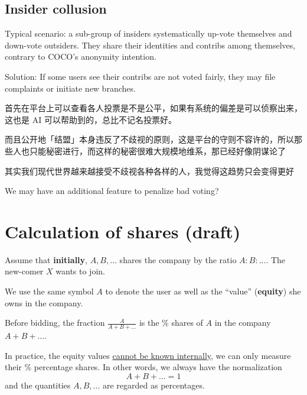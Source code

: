 \documentclass[12pt, orivec, fleqn]{article}
\newcommand{\cc}[2]{#1}
\newcommand{\cc}[2]{#2}
\begin{document}
\secttoc
\subsection{Insider collusion}

Typical scenario:  a sub-group of insiders systematically up-vote themselves and down-vote outsiders.  They share their identities and contribs among themselves, contrary to COCO's anonymity intention.

Solution:  If some users see their contribs are not voted fairly, they may file complaints or initiate new branches.

\cc{
首先在平台上可以查看各人投票是不是公平，如果有系统的偏差是可以侦察出来，这也是 AI 可以帮助到的，总比不记名投票好。}{
On our platform, we can examine every vote to see if they are fair.  If there is systematic bias it can be detected by people or AI algorithms.  This is definitely an improvement over secret ballot.
}

\cc{
而且公开地「结盟」本身违反了不歧视的原则，这是平台的守则不容许的，所以那些人也只能秘密进行，而这样的秘密很难大规模地维系，那已经好像阴谋论了}{
It is clearly against Coco's policy to form off-platform ``alliances'' to try to influence voting.  Such collusions can only be conducted in secret and would be hard to maintain for large numbers of people.  
}

\cc{
其实我们现代世界越来越接受不歧视各种各样的人，我觉得这趋势只会变得更好}{
	
}

We may have an additional feature to penalize bad voting?

\secttoc
\section{Calculation of shares (draft)}

Assume that \textbf{initially}, $A, B, ...$ shares the company by the ratio $A : B : ...$.  The new-comer $X$ wants to join.

We use the same symbol $A$ to denote the user as well as the ``value'' (\textbf{equity}) she owns in the company.  

Before bidding, the fraction $\frac{A}{A + B + ...}$ is the \% shares of $A$ in the company $A + B + ...$.

In practice, the equity values \uline{cannot be known internally}, we can only measure their \% percentage shares.  In other words, we always have the normalization
\begin{equation}
A + B + ... = 1
\end{equation}
and the quantities $A, B, ...$ are regarded as percentages.
\end{document}
